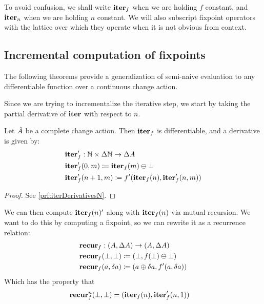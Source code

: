 To avoid confusion, we shall write $\mathbf{iter}_f$ when we are holding $f$ constant,
and $\mathbf{iter}_n$ when we are holding $n$ constant. We will also subscript fixpoint
operators with the lattice over which they operate when it is not obvious from context.

\subsection{Incremental computation of fixpoints}

The following theorems provide a
generalization of semi-naive evaluation to any differentiable function over a
continuous change action. 

Since we are trying to incrementalize the iterative step, we start by taking the partial
derivative of $\mathbf{iter}$ with respect to $n$.

\begin{prop}[name=Derivative of the iteration map with respect to $n$, restate=iterDerivativesN]
  \label{prop:iterDerivativesN}
  Let $\hat{A}$ be a complete change action. Then $\mathbf{iter}_f$ is differentiable, and a derivative is given by:
  \begin{align*}
    &\mathbf{iter}_f': \mathbb{N} \times \Delta \mathbb{N} \rightarrow \Delta A\\
    &\mathbf{iter}_f'(0, m) \coloneqq \mathbf{iter}_f(m) \ominus \bot\\
    &\mathbf{iter}_f'(n+1, m) \coloneqq f'(\mathbf{iter}_f(n), \mathbf{iter}_f'(n, m))
  \end{align*}
\end{prop}
\ifproofs
\begin{proof}
  See \cref{prf:iterDerivativesN}.
\end{proof}
\fi

We can then compute $\mathbf{iter}_f(n)'$ along with $\mathbf{iter}_f(n)$ via mutual recursion.
We want to do this by computing a fixpoint, so we can rewrite it as a recurrence
relation:
\begin{align*}
  &\mathbf{recur}_f : (A, \Delta A) \rightarrow (A, \Delta A)\\
  &\mathbf{recur}_f (\bot, \bot) \coloneqq (\bot, f(\bot) \ominus \bot)\\
  &\mathbf{recur}_f (a, \delta a) \coloneqq (a \oplus \delta a, f'(a, \delta a))
\end{align*}
Which has the property that
\begin{align*}
  &\mathbf{recur}_f^n (\bot, \bot) = (\mathbf{iter}_f(n), \mathbf{iter}_f'(n, 1))
\end{align*}

